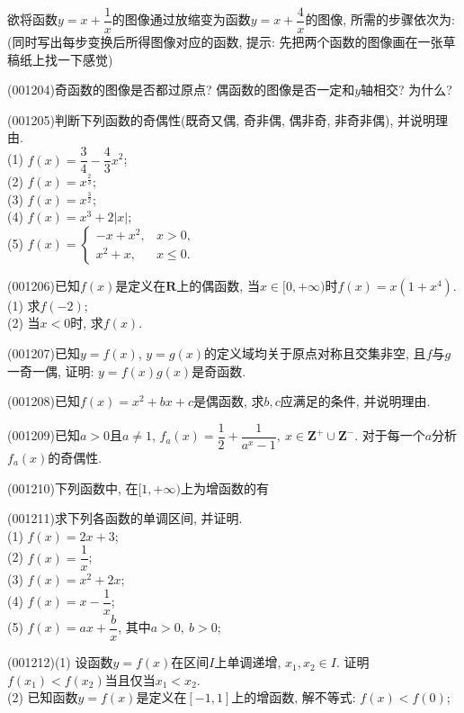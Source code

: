 欲将函数$y=x+\dfrac{1}{x}$的图像通过放缩变为函数$y=x+\dfrac{4}{x}$的图像, 所需的步骤依次为: (同时写出每步变换后所得图像对应的函数, 提示: 先把两个函数的图像画在一张草稿纸上找一下感觉)
\item (001204)奇函数的图像是否都过原点? 偶函数的图像是否一定和$y$轴相交? 为什么?
\item (001205)判断下列函数的奇偶性(既奇又偶, 奇非偶, 偶非奇, 非奇非偶), 并说明理由.\\ 
(1) $f(x)=\dfrac{3}{4}-\dfrac{4}{3}x^2$;\\ 
(2) $f(x)=x^{\frac{2}{3}}$;\\ 
(3) $f(x)=x^{\frac{3}{2}}$;\\ 
(4) $f(x)=x^3+2|x|$;\\ 
(5) $f(x)=\left\{\begin{array}{ll}-x+x^2,& x>0,\\x^2+x,& x\le 0.\end{array}\right.$
\item (001206)已知$f(x)$是定义在$\mathbf{R}$上的偶函数, 当$x\in [0,+\infty)$时$f(x)=x(1+x^4)$.\\ 
(1) 求$f(-2)$;\\ 
(2) 当$x<0$时, 求$f(x)$.
\item (001207)已知$y=f(x)$, $y=g(x)$的定义域均关于原点对称且交集非空, 且$f$与$g$一奇一偶, 证明: $y=f(x)g(x)$是奇函数.
\item (001208)已知$f(x)=x^2+bx+c$是偶函数, 求$b,c$应满足的条件, 并说明理由.
\item (001209)已知$a>0$且$a\ne 1$, $f_a(x)=\dfrac{1}{2}+\dfrac{1}{a^x-1},\ x \in \mathbf{Z}^+\cup \mathbf{Z}^-$. 对于每一个$a$分析$f_a(x)$的奇偶性.
\item (001210)下列函数中, 在$[1,+\infty)$上为增函数的有
\item (001211)求下列各函数的单调区间, 并证明.\\ 
(1) $f(x)=2x+3$;\\ 
(2) $f(x)=\dfrac{1}{x}$;\\ 
(3) $f(x)=x^2+2x$;\\ 
(4) $f(x)=x-\dfrac{1}{x}$;\\ 
(5) $f(x)=ax+\dfrac{b}{x}$, 其中$a>0, \ b>0$;
\item (001212)(1) 设函数$y=f(x)$在区间$I$上单调递增, $x_1,x_2\in I$. 证明$f(x_1)<f(x_2)$当且仅当$x_1<x_2$.\\ 
(2) 已知函数$y=f(x)$是定义在$[-1,1]$上的增函数, 解不等式: $f(x)<f(0)$;\\ 
